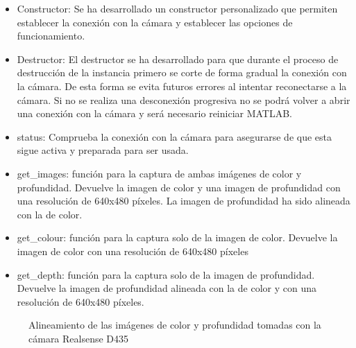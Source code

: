 \begin{itemize}
\item Constructor: Se ha desarrollado un constructor personalizado que permiten establecer la conexión con la cámara y establecer las opciones de funcionamiento.
\item Destructor: El destructor se ha desarrollado para que durante el proceso de destrucción de la instancia primero se corte de forma gradual la conexión con la cámara. De esta forma se evita futuros errores al intentar reconectarse a la cámara. Si no se realiza una desconexión progresiva no se podrá volver a abrir una conexión con la cámara y será necesario reiniciar MATLAB.
\item status: Comprueba la conexión con la cámara para asegurarse de que esta sigue activa y preparada para ser usada.
\item get\_images: función para la captura de ambas imágenes de color y profundidad. Devuelve la imagen de color y una imagen de profundidad con una resolución de 640x480 píxeles. La imagen de profundidad ha sido alineada con la de color.
\item get\_colour: función para la captura solo de la imagen de color. Devuelve la imagen de color con una resolución de 640x480 píxeles
\item get\_depth: función para la captura solo de la imagen de profundidad. Devuelve la imagen de profundidad alineada con la de color y con una resolución de 640x480 píxeles.
\end{itemize}

\begin{figure}[ht]  %
  \hfill	
  \hfill	
\caption[Alineamiento de imágenes de color y profundidad]{Alineamiento de las imágenes de color y profundidad tomadas con la cámara Realsense D435}
\label{fig:camara alineamiento}
\vspace{-5pt}
\end{figure}
